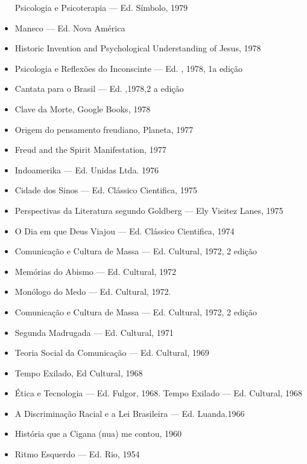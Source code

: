 \begin{itemize}
  Psicologia e Psicoterapia --- Ed. Símbolo, 1979
\item
  Maneco --- Ed. Nova América
\item
  Historic Invention and Psychological Understanding of Jesus, 1978
\item
  Psicologia e Reflexões do Inconscinte --- Ed. , 1978, 1a edição
\item
  Cantata para o Brasil --- Ed. ,1978,2 a edição
\item
  Clave da Morte, Google Books, 1978
\item
  Origem do pensamento freudiano, Planeta, 1977
\item
  Freud and the Spirit Manifestation, 1977
\item
  Indoamerika --- Ed. Unidas Ltda. 1976
\item
  Cidade dos Sinos --- Ed. Clássico Cientifica, 1975
\item
  Perspectivas da Literatura segundo Goldberg --- Ely Vieitez Lanes,
  1975
\item
  O Dia em que Deus Viajou --- Ed. Clássico Cientifica, 1974
\item
  Comunicação e Cultura de Massa --- Ed. Cultural, 1972, 2 edição
\item
  Memórias do Abismo --- Ed. Cultural, 1972
\item
  Monólogo do Medo --- Ed. Cultural, 1972.
\item
  Comunicação e Cultura de Massa --- Ed. Cultural, 1972, 2 edição
\item
  Segunda Madrugada --- Ed. Cultural, 1971
\item
  Teoria Social da Comunicação --- Ed. Cultural, 1969
\item
  Tempo Exilado, Ed Cultural, 1968
\item
  Ética e Tecnologia --- Ed. Fulgor, 1968. Tempo Exilado --- Ed.
  Cultural, 1968
\item
  A Discriminação Racial e a Lei Brasileira --- Ed. Luanda.1966
\item
  História que a Cigana (nua) me contou, 1960
\item
  Ritmo Esquerdo --- Ed. Rio, 1954
\end{itemize}


